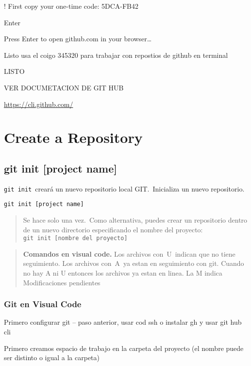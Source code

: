 \documentclass[
  a2paper,
]{article}
\begin{document}
! First copy your one-time code: 5DCA-FB42

Enter

Press Enter to open github.com in your browser\ldots~~

Listo usa el coigo 345320 para trabajar con repostios de github en
terminal

LISTO

VER DOCUMETACION DE GIT HUB

\url{https://cli.github.com/}

\hypertarget{create-a-repository}{%
\section{Create a Repository}\label{create-a-repository}}

\hypertarget{git-init-project-name}{%
\subsection{git init {[}project name{]}}\label{git-init-project-name}}

\texttt{git\ init}~creará un nuevo repositorio local GIT.~Inicializa un
nuevo repositorio.

\texttt{git\ init\ {[}project\ name{]}}

\begin{quote}
Se hace solo una vez.~Como alternativa, puedes crear un repositorio
dentro de un nuevo directorio especificando el nombre del proyecto:~
\texttt{git\ init\ {[}nombre\ del\ proyecto{]}}
\end{quote}

\begin{quote}
\textbf{Comandos en visual code.} Los archivos con~U~indican que no
tiene seguimiento. Los archivos con~A~ya estan en seguimiento con git.
Cuando no hay A ni U entonces los archivos ya estan en linea. La M
indica Modificaciones pendientes
\end{quote}

\hypertarget{git-en-visual-code}{%
\subsubsection{Git en Visual Code}\label{git-en-visual-code}}

Primero configurar git -- paso anterior, usar cod ssh o instalar gh y
usar git hub cli

Primero creamos espacio de trabajo en la carpeta del proyecto (el nombre
puede ser distinto o igual a la carpeta)
\end{document}
